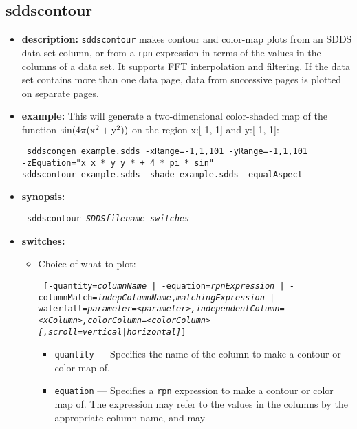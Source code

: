 \begin{latexonly}
\newpage
\end{latexonly}
\subsection{sddscontour}
\label{sddscontour}

\begin{itemize}
\item {\bf description:} 
\verb|sddscontour| makes contour and color-map plots from an SDDS data set column, or from a \verb|rpn| expression
in terms of the values in the columns of a data set.  It supports FFT interpolation and filtering.  If the
data set contains more than one data page, data from successive pages is plotted on separate pages.

\item {\bf example:}
This will generate a two-dimensional color-shaded map of the function ${\rm sin(4\pi (x^2 + y^2))}$ on
the region x:[-1, 1] and y:[-1, 1]:
\begin{flushleft}{\tt
sddscongen example.sdds -xRange=-1,1,101 -yRange=-1,1,101 \\
-zEquation="x x * y y * + 4 * pi * sin"\\
sddscontour example.sdds -shade example.sdds -equalAspect
}\end{flushleft}
\item {\bf synopsis:}
\begin{flushleft}{\tt
sddscontour {\em SDDSfilename} {\em switches}
}\end{flushleft}
\item {\bf switches:}
    \begin{itemize}
    \item Choice of what to plot:
\begin{flushleft}{\tt
[{-quantity={\em columnName} | -equation={\em rpnExpression} | 
 -columnMatch={\em indepColumnName},{\em matchingExpression}} |
 -waterfall={\em parameter=<parameter>,independentColumn=<xColumn>,colorColumn=<colorColumn>[,scroll=vertical|horizontal]}]
 }\end{flushleft}
        \begin{itemize}
        \item \verb|quantity| --- Specifies the name of the column to make a contour or color map of.
        \item \verb|equation| --- Specifies a \verb|rpn| expression to make a contour or color map of.
        The expression may refer to the values in the columns by the appropriate column name, and may

\end{itemize}
\end{itemize}
\end{itemize}
